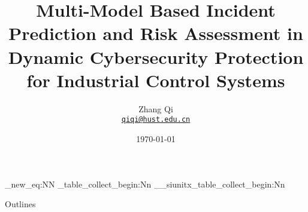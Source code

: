 \usepackage{Theme/BeamerTheme}
\usepackage{mathrsfs}
\usepackage{amsmath}
\usepackage{bm}
\usepackage{mathtools}
\usepackage{booktabs}
\usepackage{ragged2e}
\justifying
\let\raggedright\justifying
\usepackage{tikz}
\usepackage{tkz-euclide}
\usetikzlibrary{decorations.text}
\usetikzlibrary{shadows}
\usetikzlibrary{shapes}
\usetikzlibrary{circuits.logic.CDH}
\usetikzlibrary{arrows.meta}
\usetikzlibrary{decorations.pathmorphing}
\usepackage{pgfplots}


\usepackage{tabu}
\usepackage{graphicx}
\usepackage{colortbl}

\usepackage{siunitx}
\ExplSyntaxOn
\cs_new_eq:NN \siunitx_table_collect_begin:Nn \__siunitx_table_collect_begin:Nn
\ExplSyntaxOff

\usepackage{soul}


\newcommand{\pgfdefaultlinewidth}{0.75pt}

\title{Multi-Model Based Incident Prediction and Risk Assessment in Dynamic Cybersecurity Protection for Industrial Control Systems}
\subtitle{}
\date{\today}
\author[Zhang Qi] %
{
  Zhang Qi\\
  \href{mailto:qiqi@hust.edu.cn}{{\tt qiqi@hust.edu.cn}}
}

\newcommand{\risk}{\mathscr{R}}




\label{Title}
\maketitle

\begin{frame}[noframenumbering]{Outlines}\label{Outlines}
    \scriptsize
    \tableofcontents %
\end{frame}

